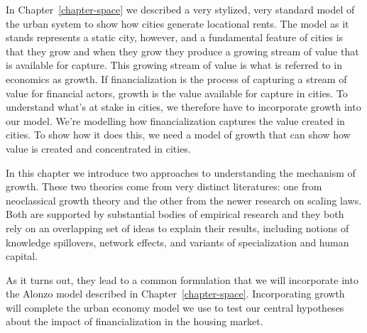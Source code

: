 In Chapter~\ref{chapter-space} we described a very stylized, very standard model of the urban system to show how cities generate locational rents.
The model as it stands represents a static city, however, and a fundamental feature of cities is that they grow and when they grow they produce a growing stream of value that is available for capture. %
%
This growing stream of value is what is referred to in economics as growth. If financialization is the process of capturing a stream of value for financial actors, growth is the value available for capture in cities. To understand what's at stake in cities, we therefore have to incorporate growth into our model. 
We're modelling how financialization captures the value created in cities. To show how it does this, we need %
 a model of growth that can show how value is created and concentrated in cities. %


In this chapter we introduce two approaches to understanding the mechanism of growth. These two theories come from very distinct literatures: one from neoclassical growth theory and the other from the newer research on scaling laws. Both are supported by substantial bodies of empirical research and they both rely on  an overlapping set of ideas to explain their results, including notions of knowledge spillovers, network effects, and variants of specialization and human capital. 

As it turns out, they lead to a common formulation that we will incorporate into the Alonzo model described in  Chapter~\ref{chapter-space}. 
Incorporating growth will complete the urban economy model we use to test our central hypotheses about the impact of financialization in the housing market.%

